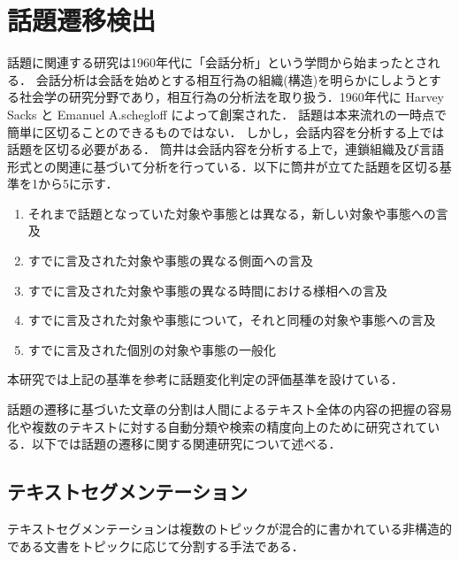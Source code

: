 \section{話題遷移検出}
\label{rel:topic}
話題に関連する研究は1960年代に「会話分析」という学問から始まったとされる．
会話分析は会話を始めとする相互行為の組織(構造)を明らかにしようとする社会学の研究分野であり，相互行為の分析法を取り扱う．1960年代に Harvey Sacks と Emanuel A.schegloff \cite{convAnalysis}によって創案された．
%
話題は本来流れの一時点で簡単に区切ることのできるものではない．
しかし，会話内容を分析する上では話題を区切る必要がある．
筒井\cite{zatsudan}は会話内容を分析する上で，連鎖組織及び言語形式との関連に基づいて分析を行っている．以下に筒井が立てた話題を区切る基準を1から5に示す．
\begin{enumerate}
  \item それまで話題となっていた対象や事態とは異なる，新しい対象や事態への言及\label{enum:zatsudan1}
  \item すでに言及された対象や事態の異なる側面への言及
  \item すでに言及された対象や事態の異なる時間における様相への言及
  \item すでに言及された対象や事態について，それと同種の対象や事態への言及
  \item すでに言及された個別の対象や事態の一般化\label{enum:zatsudan5}
\end{enumerate}
本研究では上記の基準を参考に話題変化判定の評価基準を設けている．

話題の遷移に基づいた文章の分割は人間によるテキスト全体の内容の把握の容易化や複数のテキストに対する自動分類や検索の精度向上のために研究されている．以下では話題の遷移に関する関連研究について述べる．
\subsection{テキストセグメンテーション}
テキストセグメンテーションは複数のトピックが混合的に書かれている非構造的である文書をトピックに応じて分割する手法である．
